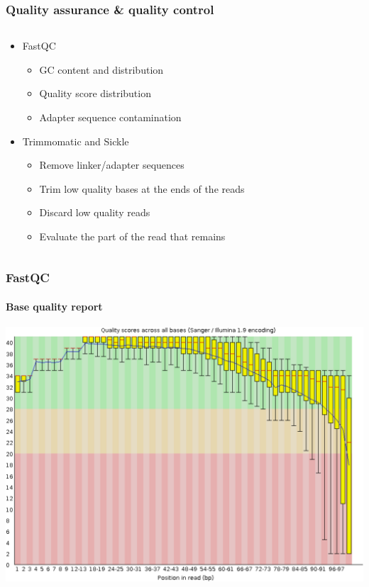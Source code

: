 \documentclass{beamer}			  %
\begin{document}
\begin{frame}
\frametitle{Quality assurance \& quality control}
  \begin{columns}[T]
	\begin{column}{.72\textwidth}
	\begin{itemize}
		\item FastQC
		\begin{itemize}
			\item GC content and distribution
			\item Quality score distribution
			\item Adapter sequence contamination
		\end{itemize}
		\item Trimmomatic and Sickle
		\begin{itemize}
			\item Remove linker/adapter sequences
			\item Trim low quality bases at the ends of the reads
			\item Discard low quality reads
			\item Evaluate the part of the read that remains
		\end{itemize}
	\end{itemize}
	\end{column}
	\begin{column}{.28\textwidth}
	\end{column}
  \end{columns}
\end{frame}

\begin{frame}
\frametitle{FastQC}
\framesubtitle{Base quality report}
	\begin{center}
		\includegraphics[height=0.75\textheight]{figures/dge_03cp.png}
	\end{center}
\end{frame}
\end{document}
